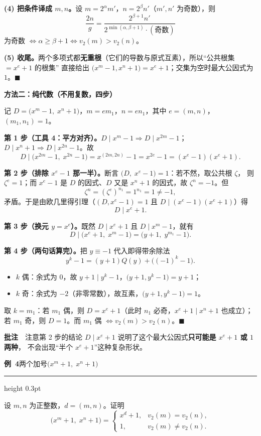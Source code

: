 \documentclass[11pt,a4paper,fontset=windows]{ctexart}
\newcommand{\usub}[1]{\Needspace{6\baselineskip}\par\vspace{10pt}%
  {\normalsize\bfseries\songti #1}\par\vspace{2pt}}
\newcommand{\uex}[2]{\Needspace{9\baselineskip}\par\vspace{14pt}\noindent
  {\large\bfseries\songti 例~#1}\hfill{\small\color{hdgray}\songti #2}\par\vspace{2pt}%
  \hrule height 0.3pt\par\vspace{6pt}}
\newcommand{\uann}[1]{\par\vspace{3pt}\noindent
  {\small\color{hdgray}\songti\textbf{批注}\ \ #1}\par\vspace{1pt}}
\begin{document}
\textbf{(4) 把条件译成 $m,n$。}设 $m=2^{\alpha}m'$，$n=2^{\beta}n'$（$m',n'$ 为奇数），则
\[
\frac{2n}{g}=\frac{2^{\beta+1}n'}{2^{\min(\alpha,\beta+1)}\cdot(\text{奇数})}
\]
为奇数 $\iff \alpha\ge\beta+1\iff v_{2}(m)>v_{2}(n)$。

\textbf{(5) 收尾。}两个多项式都\textbf{无重根}（它们的导数与原式互素），所以“公共根集 $=x^{e}+1$ 的根集”
直接给出 $\bigl(x^{m}-1,x^{n}+1\bigr)=x^{e}+1$；交集为空时最大公因式为 $1$。$\blacksquare$

\usub{方法二：纯代数（不用复数，四步）}

记 $D=\bigl(x^{m}-1,\;x^{n}+1\bigr)$，$m=em_{1}$，$n=en_{1}$，其中 $e=(m,n)$，$(m_{1},n_{1})=1$。

\textbf{第 1 步（工具 4：平方对齐）。}$D\mid x^{m}-1\Rightarrow D\mid x^{2m}-1$；
$D\mid x^{n}+1\Rightarrow D\mid x^{2n}-1$。故
\[
D\mid\bigl(x^{2m}-1,\;x^{2n}-1\bigr)=x^{(2m,2n)}-1=x^{2e}-1=(x^{e}-1)(x^{e}+1).
\]

\textbf{第 2 步（排除 $x^{e}-1$ 那一半）。}断言 $\bigl(D,\;x^{e}-1\bigr)=1$：若不然，取公共根 $\zeta$，
则 $\zeta^{e}=1$；而 $x^{e}-1$ 是 $D$ 的因式、$D$ 又是 $x^{n}+1$ 的因式，故 $\zeta^{n}=-1$。但
\[
\zeta^{n}=(\zeta^{e})^{n_{1}}=1^{n_{1}}=1\neq-1,
\]
矛盾。于是由欧几里得引理（$(D,x^{e}-1)=1$ 且 $D\mid(x^{e}-1)(x^{e}+1)$）得
\[
D\mid x^{e}+1 .
\]

\textbf{第 3 步（换元 $y=x^{e}$）。}既然 $D\mid x^{e}+1$ 且 $D\mid x^{m}-1$，就有
\[
D\mid\bigl(x^{e}+1,\;x^{m}-1\bigr)=\bigl(y+1,\;y^{m_{1}}-1\bigr).
\]

\textbf{第 4 步（两句话算完）。}把 $y\equiv-1$ 代入即得带余除法
\[
y^{k}-1=(y+1)Q(y)+\bigl((-1)^{k}-1\bigr).
\]
\begin{itemize}[leftmargin=2em,itemsep=1pt,topsep=2pt]
\item $k$ 偶：余式为 $0$，故 $y+1\mid y^{k}-1$，$\bigl(y+1,y^{k}-1\bigr)=y+1$；
\item $k$ 奇：余式为 $-2$（非零常数），故互素，$\bigl(y+1,y^{k}-1\bigr)=1$。
\end{itemize}
取 $k=m_{1}$：若 $m_{1}$ 偶，则 $D=x^{e}+1$（此时 $n_{1}$ 必奇，$x^{e}+1\mid x^{n}+1$ 也成立）；
若 $m_{1}$ 奇，则 $D=1$。而 $m_{1}$ 偶 $\iff v_{2}(m)>v_{2}(n)$。$\blacksquare$

\uann{注意第 2 步的结论 $D\mid x^{e}+1$ 说明了这个最大公因式\textbf{只可能是 $x^{e}+1$ 或 $1$ 两种}，
不会出现“半个 $x^{e}+1$”这种复杂形状。}

\uex{4}{两个加号\quad $\bigl(x^{m}+1,\;x^{n}+1\bigr)$}
设 $m,n$ 为正整数，$d=(m,n)$。证明
\[
\bigl(x^{m}+1,\;x^{n}+1\bigr)=
\begin{cases}
x^{d}+1, & v_{2}(m)=v_{2}(n),\\[3pt]
1, & v_{2}(m)\neq v_{2}(n).
\end{cases}
\]
\end{document}
